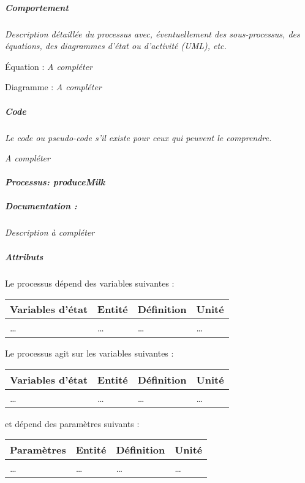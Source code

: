 \documentclass[
]{article}
\begin{document}
\subparagraph{Comportement}\label{comportement-1}

\emph{Description détaillée du processus avec, éventuellement des
sous-processus, des équations, des diagrammes d'état ou d'activité
(UML), etc.}

Équation : \emph{A compléter}

Diagramme : \emph{A compléter}

\subparagraph{Code}\label{code-1}

\emph{Le code ou pseudo-code s'il existe pour ceux qui peuvent le
comprendre.}

\emph{A compléter}

\paragraph{\texorpdfstring{\emph{Processus:
produceMilk}}{Processus: produceMilk}}\label{processus-producemilk}

\subparagraph{Documentation :}\label{documentation-7}

\emph{Description à compléter}

\subparagraph{Attributs}\label{attributs-7}

Le processus dépend des variables suivantes :

\begin{longtable}[]{@{}llll@{}}
\toprule\noalign{}
\textbf{Variables d'état} & \textbf{Entité} & \textbf{Définition} &
\textbf{Unité} \\
\midrule\noalign{}
\endhead
\bottomrule\noalign{}
\endlastfoot
\ldots{} & \ldots{} & \ldots{} & \ldots{} \\
\end{longtable}

Le processus agit sur les variables suivantes :

\begin{longtable}[]{@{}llll@{}}
\toprule\noalign{}
\textbf{Variables d'état} & \textbf{Entité} & \textbf{Définition} &
\textbf{Unité} \\
\midrule\noalign{}
\endhead
\bottomrule\noalign{}
\endlastfoot
\ldots{} & \ldots{} & \ldots{} & \ldots{} \\
\end{longtable}

et dépend des paramètres suivants :

\begin{longtable}[]{@{}llll@{}}
\toprule\noalign{}
\textbf{Paramètres} & \textbf{Entité} & \textbf{Définition} &
\textbf{Unité} \\
\midrule\noalign{}
\endhead
\bottomrule\noalign{}
\endlastfoot
\ldots{} & \ldots{} & \ldots{} & \ldots{} \\
\end{longtable}
\end{document}
